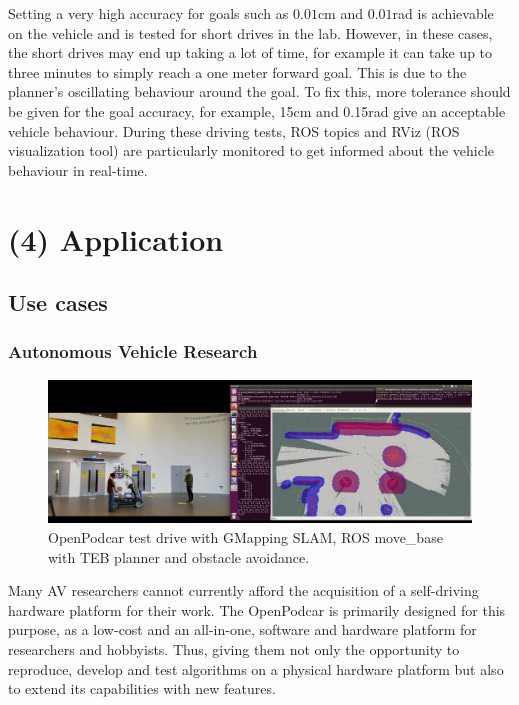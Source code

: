 \documentclass[a4paper]{article}
\begin{document}
	Setting a very high accuracy for goals such as $0.01$cm and $0.01$rad is achievable on the vehicle and is tested for short drives in the lab. However, in these cases, the short drives may end up taking a lot of time, for example it can take up to three minutes to simply reach a one meter forward goal. This is due to the planner's oscillating behaviour around the goal. To fix this, more tolerance should be given for the goal accuracy, for example, 15cm and 0.15rad give an acceptable vehicle behaviour. During these driving tests, ROS topics and RViz (ROS visualization tool) are particularly monitored to get informed about the vehicle behaviour in real-time. 
	
	
	
	\section{(4) Application}\label{h.f78bi3oom0mu}
	
	\subsection{Use cases}
	
	\subsubsection{Autonomous Vehicle Research}\label{h.4q5g9edishy3}
	
	\begin{figure}
		\centering
		\includegraphics[width=\columnwidth]{software/move_base_collision_avoidance.png}
		\caption{OpenPodcar test drive with GMapping SLAM, ROS move\_base with TEB planner and obstacle avoidance.}
		\label{fig:testDrive_gmapping}
	\end{figure}
	
	Many AV researchers cannot currently afford the acquisition of a self-driving hardware platform for their work. The OpenPodcar is primarily designed for this purpose, as a low-cost and an all-in-one, software and hardware platform for researchers and hobbyists. Thus, giving them not only the opportunity to reproduce, develop and test algorithms on a physical hardware platform but also to extend its capabilities with new features. 
	
\end{document}
